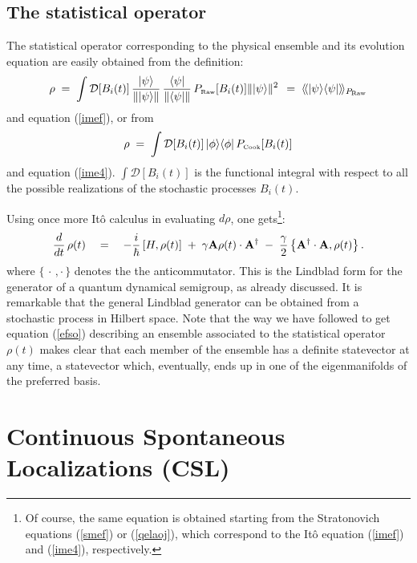 \documentclass[10pt,a4paper]{article}
\newcommand{\llangle}{\langle\!\langle}
\newcommand{\rrangle}{\rangle\!\rangle}
\begin{document}
\subsection{The statistical operator} \label{sec65}

The statistical operator corresponding to the physical ensemble
and its evolution equation are easily obtained from the
definition:
\begin{equation} \label{hjkg}
\rho \; = \;  \int {\mathcal D}[B_{i}(t)]\, \frac{|\psi\rangle}{\|
|\psi\rangle \|}\, \frac{\langle \psi|}{\|\langle\psi|\|}\,
P_{\makebox{\tiny Raw}}[B_{i}(t)]\| | \psi\rangle \|^{2}\, \; = \;
\llangle |\psi \rangle \langle \psi| \rrangle_{P_{\makebox{\tiny
Raw}}}
\end{equation}
and equation (\ref{imef}), or from
\begin{equation}
\rho \; = \; \int {\mathcal D}[B_{i}(t)]\, |\phi \rangle\langle
\phi|\, P_{\makebox{\tiny Cook}}[B_{i}(t)]
\end{equation}
and equation (\ref{ime4}). $\int {\mathcal D}[B_{i}(t)]$ is the
functional integral with respect to all the possible realizations
of the stochastic processes $B_{i}(t)$.

Using once more It\^o calculus in evaluating $d\rho$, one
gets\footnote{Of course, the same equation is obtained starting
from the Stratonovich equations (\ref{smef}) or (\ref{qelaoj}),
which correspond to the It\^o equation (\ref{imef}) and
(\ref{ime4}), respectively.}:
\begin{equation} \label{efso}
\frac{d}{dt}\, \rho(t) \quad = \quad -\frac{i}{\hbar}\, [H,
\rho(t)] \; + \; \gamma {\bf A} \rho(t)\cdot {\bf A}^{\dagger} \;
- \; \frac{\gamma}{2} \left\{ {\bf A}^{\dagger}\cdot {\bf A},
\rho(t) \right\}.
\end{equation}
where $\{ \, \cdot \, ,\cdot \, \}$ denotes the the
anticommutator. This is the Lindblad  form for the generator of a
quantum dynamical semigroup, as already discussed. It is
remarkable that the general Lindblad generator can be obtained
from a stochastic process in Hilbert space. Note that the way we
have followed to get equation (\ref{efso}) describing an ensemble
associated to the statistical operator $\rho \! \left( t \right)$
makes clear that each member of the ensemble has a definite
statevector at any time, a statevector which, eventually, ends up
in one of the eigenmanifolds of the preferred basis.



\section{Continuous Spontaneous Localizations (CSL)} \label{sec7}
\end{document}
